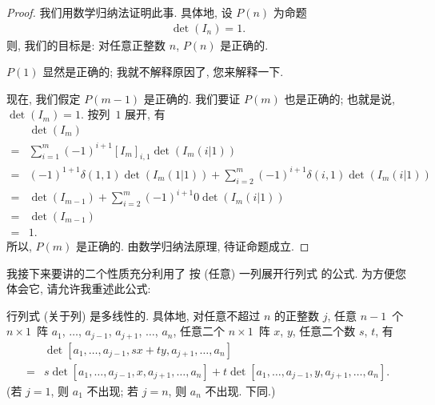 \documentclass[%
    UTF8,%
    fontset=none,%
    punct=kaiming,%
    zihao=-4,%
    a4paper,%
    oneside,%
]{ctexbook}
\begin{document}
\begin{proof}
    我们用数学归纳法证明此事.
    具体地, 设 \(P(n)\) 为命题
    \begin{align*}
        \det {(I_n)} = 1.
    \end{align*}
    则, 我们的目标是:
    对任意正整数 \(n\), \(P(n)\) 是正确的.

    \(P(1)\) 显然是正确的;
    我就不解释原因了, 您来解释一下.

    现在, 我们假定 \(P(m-1)\) 是正确的.
    我们要证 \(P(m)\) 也是正确的;
    也就是说, \(\det {(I_m)} = 1\).
    按列~\(1\) 展开, 有
    \begin{align*}
             & \det {(I_m)}
        \\
        = {} & \sum_{i = 1}^{m}
        {(-1)^{i+1} [I_m]_{i,1} \det {(I_m (i|1))}}
        \\
        = {} & (-1)^{1+1} \delta(1, 1) \det {(I_m (1|1))}
        + \sum_{i = 2}^{m}
        {(-1)^{i+1} \delta(i, 1) \det {(I_m (i|1))}}
        \\
        = {} & \det {(I_{m-1})}
        + \sum_{i = 2}^{m}
        {(-1)^{i+1} 0 \det {(I_m (i|1))}}
        \\
        = {} & \det {(I_{m-1})}
        \\
        = {} & 1.
    \end{align*}
    所以, \(P(m)\) 是正确的.
    由数学归纳法原理, 待证命题成立.
\end{proof}

我接下来要讲的二个性质充分利用了%
按 (任意) 一列展开行列式%
的公式.
为方便您体会它,
请允许我重述此公式:

\TheoremExpansionAboutAnyColumn*

\begin{theorem}[多线性]
    行列式 (关于列) 是多线性的.
    具体地, 对任意不超过 \(n\) 的正整数 \(j\),
    任意 \(n-1\)~个 \(n \times 1\)~阵
    \(a_1\), \(\dots\), \(a_{j-1}\),
    \(a_{j+1}\), \(\dots\), \(a_n\),
    任意二个 \(n \times 1\)~阵 \(x\), \(y\),
    任意二个数 \(s\), \(t\),
    有
    \begin{align*}
             & \det
        {[a_1, \dots, a_{j-1}, sx + ty, a_{j+1}, \dots, a_n]}
        \\
        = {} &
        s
        \det {[a_1, \dots, a_{j-1}, x, a_{j+1}, \dots, a_n]}
        +
        t
        \det {[a_1, \dots, a_{j-1}, y, a_{j+1}, \dots, a_n]}.
    \end{align*}
    (若 \(j = 1\), 则 \(a_1\) 不出现;
    若 \(j = n\), 则 \(a_n\) 不出现.
    下同.)
\end{theorem}
\end{document}
